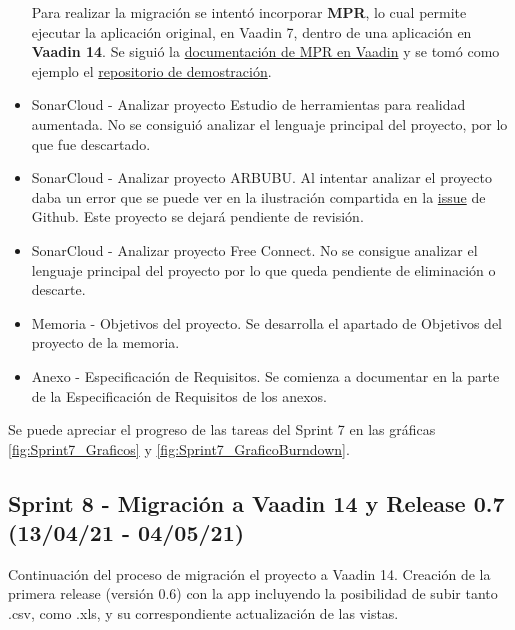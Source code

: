 \begin{itemize}
		
		Para realizar la migración se intentó incorporar \textbf{MPR}, lo cual permite ejecutar la aplicación original, en Vaadin 7, dentro de una aplicación en \textbf{Vaadin 14}. Se siguió la \href{https://vaadin.com/docs/v14/tools/mpr/introduction/step-1-maven-v7}{documentación de MPR en Vaadin} y se tomó como ejemplo el \href{https://github.com/OlliTietavainenVaadin/mpr-demo/tree/v7}{repositorio de demostración}.
	\item SonarCloud - Analizar proyecto Estudio de herramientas para realidad aumentada. 
		No se consiguió analizar el lenguaje principal del proyecto, por lo que fue descartado.
	\item SonarCloud - Analizar proyecto ARBUBU. 
		Al intentar analizar el proyecto daba un error que se puede ver en la ilustración compartida en la \href{https://github.com/dbo1001/Gestor-TFG-2021/issues/73}{issue} de Github. Este proyecto se dejará pendiente de revisión.
	\item SonarCloud - Analizar proyecto Free Connect. 
		No se consigue analizar el lenguaje principal del proyecto por lo que queda pendiente de eliminación o descarte.
	\item Memoria - Objetivos del proyecto. 
		Se desarrolla el apartado de Objetivos del proyecto de la memoria.
	\item Anexo - Especificación de Requisitos. 
		Se comienza a documentar en la parte de la Especificación de Requisitos de los anexos.
\end{itemize}

Se puede apreciar el progreso de las tareas del Sprint 7 en las gráficas \ref{fig:Sprint7_Graficos} y \ref{fig:Sprint7_GraficoBurndown}.



\subsection{Sprint 8 - Migración a Vaadin 14 y Release 0.7 (13/04/21 - 04/05/21)}
Continuación del proceso de migración el proyecto a Vaadin 14. Creación de la primera release (versión 0.6) con la app incluyendo la posibilidad de subir tanto .csv, como .xls, y su correspondiente actualización de las vistas.

